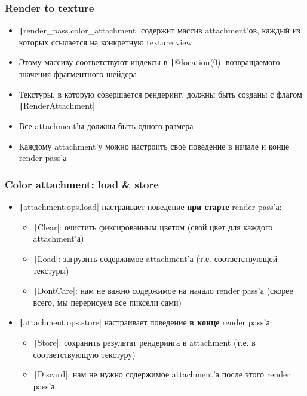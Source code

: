 \documentclass[10pt]{beamer}
\begin{document}
\begin{frame}[fragile]
\frametitle{Render to texture}
\begin{itemize}
\item \texttt|render_pass.color_attachment| содержит массив attachment'ов, каждый из которых ссылается на конкретную texture view
\pause
\item Этому массиву соответствуют индексы в \texttt|@location(0)| возвращаемого значения фрагментного шейдера
\pause
\item Текстуры, в которую совершается рендеринг, должны быть созданы с флагом \texttt|RenderAttachment|
\pause
\item Все attachment'ы должны быть одного размера
\pause
\item Каждому attachment'у можно настроить своё поведение в начале и конце render pass'а
\end{itemize}
\end{frame}

\begin{frame}[fragile]
\frametitle{Color attachment: load \& store}
\begin{itemize}
\item \texttt|attachment.ops.load| настраивает поведение \textbf{при старте} render pass'а:
\pause
\begin{itemize}
\item \texttt|Clear|: очистить фиксированным цветом (свой цвет для каждого attachment'а)
\item \texttt|Load|: загрузить содержимое attachment'а (т.е. соответствующей текстуры)
\item \texttt|DontCare|: нам не важно содержимое на начало render pass'а (скорее всего, мы перерисуем все пиксели сами)
\end{itemize}
\pause
\item \texttt|attachment.ops.store| настраивает поведение \textbf{в конце} render pass'а:
\pause
\begin{itemize}
\item \texttt|Store|: сохранить результат рендеринга в attachment (т.е. в соответствующую текстуру)
\item \texttt|Discard|: нам не нужно содержимое attachment'а после этого render pass'а
\end{itemize}
\end{itemize}
\end{frame}
\end{document}
